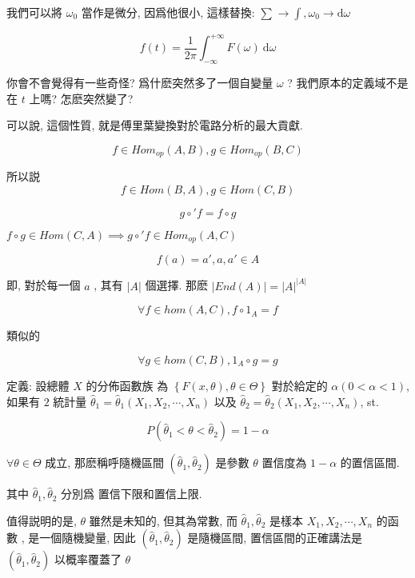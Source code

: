 \documentclass[a4paper, 10pt]{ctexbook} %
\begin{document}
我們可以將 $\omega_0$ 當作是微分, 因爲他很小, 這樣替換: $\sum_{} \to \int, \omega_0 \to \mathrm{d} \omega$

$$ f\left(t\right) = \frac{1}{2\pi}\int ^{+\infty}_{-\infty} F \left(\omega\right) \ \mathrm{d} \omega$$

你會不會覺得有一些奇怪? 爲什麽突然多了一個自變量 $\omega$ ? 我們原本的定義域不是在 $t$ 上嗎? 怎麽突然變了?

可以說, 這個性質, 就是傅里葉變換對於電路分析的最大貢獻. 







$$ f \in Hom_{op} (A , B) , g \in Hom_{op} \left(B , C\right)$$

所以説 $$ f \in Hom \left(B, A\right) , g \in Hom \left(C, B\right)$$

$$ g \circ ' f = f \circ g$$ 

$f \circ g \in Hom \left(C, A\right) \implies g \circ ' f \in Hom _{op} \left(A, C\right)$


$$f  \left(a\right) = a' , a, a ' \in A$$

即, 對於每一個 $a$ , 其有 $\left| A \right| $ 個選擇. 那麽 $\left| End \left(A\right) \right|  = \left| A \right|  ^{\left| A \right|}$

$$\forall  f \in hom \left(A, C\right), f \circ 1_{A}  = f$$

類似的

$$\forall  g \in hom \left(C, B\right) , 1_{A} \circ g = g$$

定義: 設總體 $X$ 的分佈函數族 為 $\left\{ F \left(x , \theta\right), \theta \in \Theta \right\}$ 對於給定的 $\alpha \left( 0 < \alpha < 1\right)$, 如果有 $2$ 統計量 $\hat \theta _{1} =  \hat \theta _{1} \left(X_1 , X_{2} , \cdots , X_{n}\right)$ 以及 $\hat \theta _{2} = \hat \theta _{2} \left(X_1 , X_2 , \cdots , X_{n}\right)$, st. 

$$ P\left(\hat \theta _{1} < \theta < \hat \theta _{2}\right) = 1  - \alpha$$

$\forall  \theta \in \Theta $ 成立, 那麽稱呼隨機區間 $\left( \hat \theta _{1} , \hat \theta _{2}\right)$ 是參數 $\theta $ 置信度為 $1- \alpha$ 的置信區間. 

其中 $\hat \theta _{1 }, \hat \theta _{2}$ 分別爲 置信下限和置信上限. 

值得説明的是, $\theta $ 雖然是未知的, 但其為常數, 而 $\hat \theta _{1} , \hat \theta _{2}$ 是樣本 $X_{1 } , X_{2} ,\cdots  , X_{n}$ 的函數 , 是一個隨機變量, 因此 $\left( \hat \theta _{1} , \hat \theta _{2} \right)$ 是隨機區間, 置信區間的正確講法是 $\left( \hat \theta _{1 }, \hat \theta _{2} \right)$  以概率覆蓋了 $\theta $ 
\end{document}
